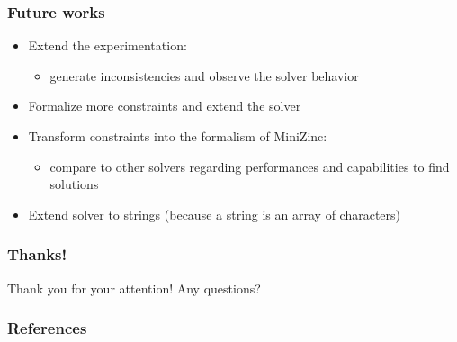 \documentclass[9pt]{beamer}
\begin{document}
\begin{frame}
\frametitle{Future works}

\begin{itemize}
\item Extend the experimentation:
\begin{itemize}
\item generate inconsistencies and observe the solver behavior
\end{itemize}
\item Formalize more constraints and extend the solver
\item Transform constraints into the formalism of MiniZinc:
\begin{itemize}
\item compare to other solvers regarding performances and capabilities to find
solutions
\end{itemize}
\item Extend solver to strings (because a string is an array of characters)
\end{itemize}

\end{frame}

\begin{frame}
\frametitle{Thanks!}

\begin{center}
Thank you for your attention! Any questions?
\end{center}

\end{frame}

\begin{frame}
\frametitle{References}



\nocite{EnderlinDGO11,EnderlinDGB12}
\end{frame}
\end{document}
